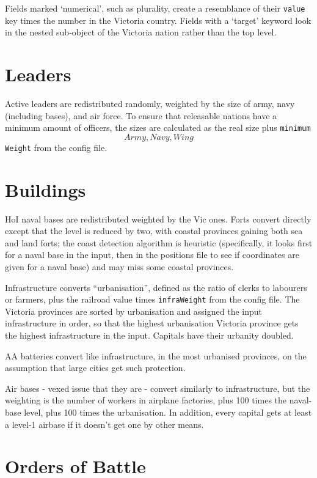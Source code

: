 \documentclass[12pt,ebook,oneside]{book}
\begin{document}
Fields marked `numerical', such as plurality, create a resemblance of
their \texttt{value} key times the number in the Victoria
country. Fields with a `target' keyword look in the nested sub-object of
the Victoria nation rather than the top level. 

\section{Leaders}

Active leaders are redistributed randomly, weighted by the size of
army, navy (including bases), and air force. To ensure that releasable
nations have a minimum amount of officers, the sizes are calculated as
the real size plus \texttt{minimum\[Army,Navy,Wing\]Weight} from the
config file. 

\section{Buildings}

HoI naval bases are redistributed weighted by the Vic ones. Forts
convert directly except that the level is reduced by two, with coastal provinces gaining both sea and land
forts; the coast detection algorithm is heuristic
(specifically, it looks first for a naval base in the input, then in
the positions file to see if coordinates are given for a naval base)
and may miss some coastal provinces. 

Infrastructure converts ``urbanisation'', defined
as the ratio of clerks to labourers or farmers, plus the railroad
value times \texttt{infraWeight} from the config file. The Victoria provinces
are sorted by urbanisation and assigned the input
infrastructure in order, so that the highest urbanisation
Victoria province gets the highest infrastructure in the
input. Capitals have their urbanity doubled. 

AA batteries convert like infrastructure, in the most urbanised
provinces, on the assumption that large cities get such protection. 

Air bases - vexed issue that they are - convert similarly to
infrastructure, but the weighting is the number of workers in airplane
factories, plus 100 times the naval-base level, plus 100 times the
urbanisation. In addition, every capital gets at least a level-1
airbase if it doesn't get one by other means. 

\section{Orders of Battle}
\end{document}
